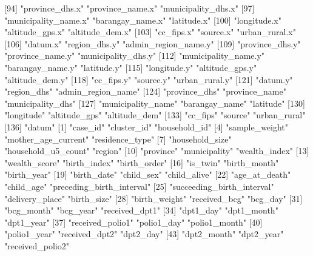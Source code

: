  [94] "province_dhs.x"            "province_name.x"           "municipality_dhs.x"       
 [97] "municipality_name.x"       "barangay_name.x"           "latitude.x"               
[100] "longitude.x"               "altitude_gps.x"            "altitude_dem.x"           
[103] "cc_fips.x"                 "source.x"                  "urban_rural.x"            
[106] "datum.x"                   "region_dhs.y"              "admin_region_name.y"      
[109] "province_dhs.y"            "province_name.y"           "municipality_dhs.y"       
[112] "municipality_name.y"       "barangay_name.y"           "latitude.y"               
[115] "longitude.y"               "altitude_gps.y"            "altitude_dem.y"           
[118] "cc_fips.y"                 "source.y"                  "urban_rural.y"            
[121] "datum.y"                   "region_dhs"                "admin_region_name"        
[124] "province_dhs"              "province_name"             "municipality_dhs"         
[127] "municipality_name"         "barangay_name"             "latitude"                 
[130] "longitude"                 "altitude_gps"              "altitude_dem"             
[133] "cc_fips"                   "source"                    "urban_rural"              
[136] "datum"                    
  [1] "case_id"                   "cluster_id"                "household_id"             
  [4] "sample_weight"             "mother_age_current"        "residence_type"           
  [7] "household_size"            "household_u5_count"        "region"                   
 [10] "province"                  "municipality"              "wealth_index"             
 [13] "wealth_score"              "birth_index"               "birth_order"              
 [16] "is_twin"                   "birth_month"               "birth_year"               
 [19] "birth_date"                "child_sex"                 "child_alive"              
 [22] "age_at_death"              "child_age"                 "preceding_birth_interval" 
 [25] "succeeding_birth_interval" "delivery_place"            "birth_size"               
 [28] "birth_weight"              "received_bcg"              "bcg_day"                  
 [31] "bcg_month"                 "bcg_year"                  "received_dpt1"            
 [34] "dpt1_day"                  "dpt1_month"                "dpt1_year"                
 [37] "received_polio1"           "polio1_day"                "polio1_month"             
 [40] "polio1_year"               "received_dpt2"             "dpt2_day"                 
 [43] "dpt2_month"                "dpt2_year"                 "received_polio2"          
